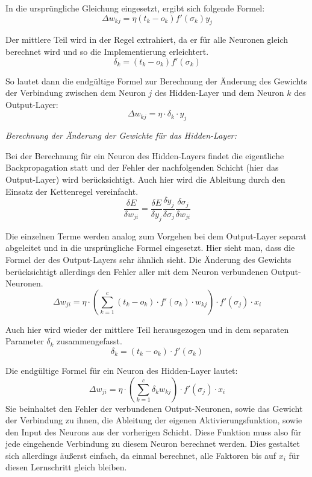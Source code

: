 In die ursprüngliche Gleichung eingesetzt, ergibt sich folgende Formel:
\begin{equation}
\Delta w_{kj} = \eta (t_k - o_k) f'(\sigma_k)y_j
\end{equation}

Der mittlere Teil wird in der Regel extrahiert, da er für alle Neuronen gleich berechnet wird und so die Implementierung erleichtert.
\begin{equation}
\delta_k = (t_k - o_k) f'(\sigma_k)
\end{equation}

So lautet dann die endgültige Formel zur Berechnung der Änderung des Gewichts der Verbindung zwischen dem Neuron $j$ des Hidden-Layer und dem Neuron $k$ des Output-Layer:
\begin{equation}
\Delta w_{kj} = \eta\cdot \delta_k \cdot y_j
\end{equation}

\emph{Berechnung der Änderung der Gewichte für das Hidden-Layer:}

Bei der Berechnung für ein Neuron des Hidden-Layers findet die eigentliche Backpropagation statt und der Fehler der nachfolgenden Schicht (hier das Output-Layer) wird berücksichtigt. Auch hier wird die Ableitung durch den Einsatz der Kettenregel vereinfacht.
\begin{equation}
\frac{\delta E}{\delta w_{ji}} = \frac{\delta E}{\delta y_j} \frac{\delta y_j}{\delta\sigma_j}\frac{\delta\sigma_j}{\delta w_{ji}}
\end{equation}

Die einzelnen Terme werden analog zum Vorgehen bei dem Output-Layer separat abgeleitet und in die ursprüngliche Formel eingesetzt. Hier sieht man, dass die Formel der des Output-Layers sehr ähnlich sieht. Die Änderung des Gewichts berücksichtigt allerdings den Fehler aller mit dem Neuron verbundenen Output-Neuronen.
\begin{equation}
\Delta w_{ji} = \eta \cdot \left(\sum_{k=1}^{c}(t_k-o_k)\cdot f'(\sigma_k)\cdot w_{kj}\right) \cdot f'(\sigma_j) \cdot x_i
\end{equation}

Auch hier wird wieder der mittlere Teil herausgezogen und in dem separaten Parameter $\delta_k$ zusammengefasst.
\begin{equation}
\delta_k = (t_k-o_k)\cdot f'(\sigma_k)
\end{equation}

Die endgültige Formel für ein Neuron des Hidden-Layer lautet:
\begin{equation}
\Delta w_{ji}=\eta \cdot \left(\sum_{k=1}^{c} \delta_k w_{kj}\right)\cdot f'(\sigma_j)\cdot x_i
\end{equation}
Sie beinhaltet den Fehler der verbundenen Output-Neuronen, sowie das Gewicht der Verbindung zu ihnen, die Ableitung der eigenen Aktivierungsfunktion, sowie den Input des Neurons aus der vorherigen Schicht. Diese Funktion muss also für jede eingehende Verbindung zu diesem Neuron berechnet werden. Dies gestaltet sich allerdings äußerst einfach, da einmal berechnet, alle Faktoren bis auf $x_i$ für diesen Lernschritt gleich bleiben.

